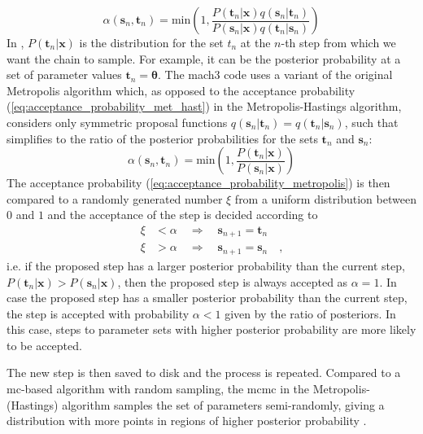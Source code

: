 %
\begin{equation} \label{eq:acceptance_probability_met_hast}
    \alpha(\mathbf{s}_n, \mathbf{t}_n)
    =
    \text{min} \left( 1, \frac{P(\mathbf{t}_n|\mathbf{x}) q(\mathbf{s}_n|\mathbf{t}_n)}
    {P(\mathbf{s}_n|\mathbf{x}) q(\mathbf{t}_n|\mathbf{s}_n)} \right)
\end{equation}  
%
In , $P(\mathbf{t}_n|\mathbf{x})$ is the distribution for the set $t_n$ at the $n$-th step from which we want the chain to sample. For example, it can be the posterior probability at a set of parameter values $\mathbf{t}_n = \boldsymbol{\theta}$. The \acrshort{mach3} code uses a variant of the original Metropolis algorithm which, as opposed to the acceptance probability (\ref{eq:acceptance_probability_met_hast}) in the Metropolis-Hastings algorithm, considers only symmetric proposal functions $q(\mathbf{s}_n|\mathbf{t}_n) = q(\mathbf{t}_n|\mathbf{s}_n)$, such that  simplifies to the ratio of the posterior probabilities for the sets $\mathbf{t}_n$ and $\mathbf{s}_n$:
%
\begin{equation} \label{eq:acceptance_probability_metropolis}
    \alpha(\mathbf{s}_n, \mathbf{t}_n)
    =
    \text{min} \left( 1, \frac{P(\mathbf{t}_n|\mathbf{x})}
    {P(\mathbf{s}_n|\mathbf{x})} \right)
\end{equation}  
%
The acceptance probability (\ref{eq:acceptance_probability_metropolis}) is then compared to a randomly generated number $\xi$ from a uniform distribution between $0$ and $1$ and the acceptance of the step is decided according to
%
\begin{align} \label{eq:acceptance_decision}
    \xi &< \alpha \quad \Longrightarrow \quad \mathbf{s}_{n+1} = \mathbf{t}_n \\ 
    \xi &> \alpha \quad \Longrightarrow \quad \mathbf{s}_{n+1} = \mathbf{s}_n \quad \text{,}
\end{align} 
%
i.e. if the proposed step has a larger posterior probability than the current step, $P(\mathbf{t}_n|\mathbf{x}) > P(\mathbf{s}_n|\mathbf{x})$, then the proposed step is always accepted as $\alpha=1$. In case the proposed step has a smaller posterior probability than the current step, the step is accepted with probability $\alpha<1$ given by the ratio of posteriors. In this case, steps to parameter sets with higher posterior probability are more likely to be accepted.

The new step is then saved to disk and the process is repeated. Compared to a \acrshort{mc}-based algorithm with random sampling, the \acrshort{mcmc} in the Metropolis-(Hastings) algorithm samples the set of parameters semi-randomly, giving a distribution with more points in regions of higher posterior probability \cite{Duffy:2017tut}. 

